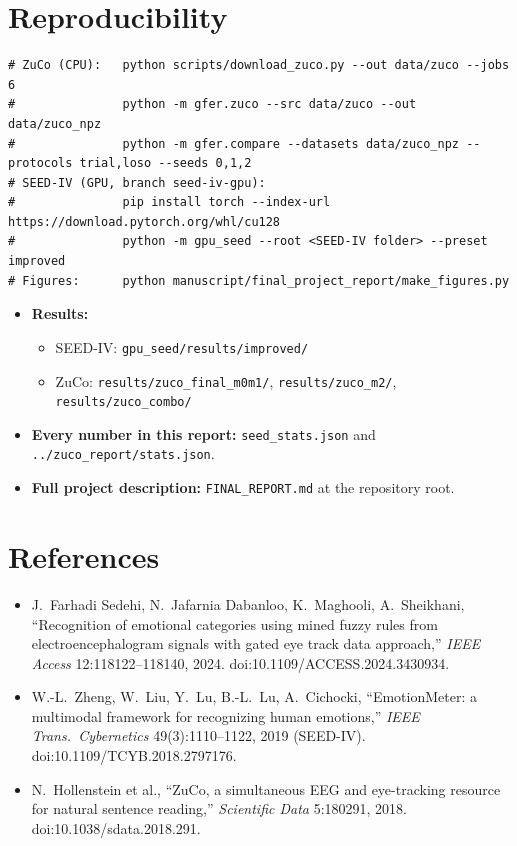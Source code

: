 \documentclass[10pt,a4paper]{article}
\begin{document}
\appendix
\section{Reproducibility}
\begin{small}
\begin{verbatim}
# ZuCo (CPU):   python scripts/download_zuco.py --out data/zuco --jobs 6
#               python -m gfer.zuco --src data/zuco --out data/zuco_npz
#               python -m gfer.compare --datasets data/zuco_npz --protocols trial,loso --seeds 0,1,2
# SEED-IV (GPU, branch seed-iv-gpu):
#               pip install torch --index-url https://download.pytorch.org/whl/cu128
#               python -m gpu_seed --root <SEED-IV folder> --preset improved
# Figures:      python manuscript/final_project_report/make_figures.py
\end{verbatim}
\end{small}
\begin{itemize}
  \item \textbf{Results:}
    \begin{itemize}
      \item SEED-IV: \texttt{gpu\_seed/results/improved/}
      \item ZuCo: \texttt{results/zuco\_final\_m0m1/}, \texttt{results/zuco\_m2/}, \texttt{results/zuco\_combo/}
    \end{itemize}
  \item \textbf{Every number in this report:} \texttt{seed\_stats.json} and \texttt{../zuco\_report/stats.json}.
  \item \textbf{Full project description:} \texttt{FINAL\_REPORT.md} at the repository root.
\end{itemize}

\section*{References}
\begin{small}
\begin{itemize}
  \item J.~Farhadi Sedehi, N.~Jafarnia Dabanloo, K.~Maghooli, A.~Sheikhani, ``Recognition of emotional categories using mined fuzzy rules from electroencephalogram signals with gated eye track data approach,'' \emph{IEEE Access} 12:118122--118140, 2024. doi:10.1109/ACCESS.2024.3430934.
  \item W.-L.~Zheng, W.~Liu, Y.~Lu, B.-L.~Lu, A.~Cichocki, ``EmotionMeter: a multimodal framework for recognizing human emotions,'' \emph{IEEE Trans.\ Cybernetics} 49(3):1110--1122, 2019 (SEED-IV). doi:10.1109/TCYB.2018.2797176.
  \item N.~Hollenstein et al., ``ZuCo, a simultaneous EEG and eye-tracking resource for natural sentence reading,'' \emph{Scientific Data} 5:180291, 2018. doi:10.1038/sdata.2018.291.
\end{itemize}
\end{small}
\end{document}
